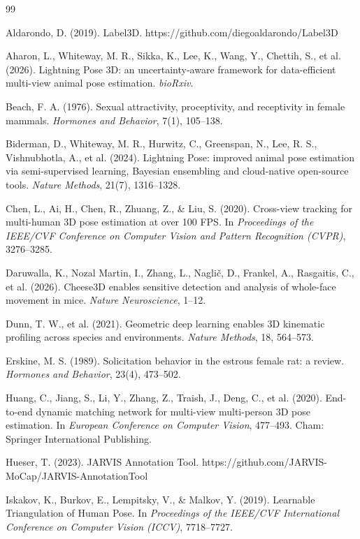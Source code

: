\documentclass[pdflatex, sn-nature]{sn-jnl}
\theoremstyle{thmstyleone}%
\theoremstyle{thmstyletwo}%
\theoremstyle{thmstylethree}%
\begin{document}
\begin{thebibliography}{99}

 Aldarondo, D. (2019). Label3D. https://github.com/diegoaldarondo/Label3D

 Aharon, L., Whiteway, M. R., Sikka, K., Lee, K., Wang, Y., Chettih, S., et al. (2026). Lightning Pose 3D: an uncertainty-aware framework for data-efficient multi-view animal pose estimation. \textit{bioRxiv}.

 Beach, F. A. (1976). Sexual attractivity, proceptivity, and receptivity in female mammals. \textit{Hormones and Behavior}, 7(1), 105--138.

 Biderman, D., Whiteway, M. R., Hurwitz, C., Greenspan, N., Lee, R. S., Vishnubhotla, A., et al. (2024). Lightning Pose: improved animal pose estimation via semi-supervised learning, Bayesian ensembling and cloud-native open-source tools. \textit{Nature Methods}, 21(7), 1316--1328.

 Chen, L., Ai, H., Chen, R., Zhuang, Z., \& Liu, S. (2020). Cross-view tracking for multi-human 3D pose estimation at over 100 FPS. In \textit{Proceedings of the IEEE/CVF Conference on Computer Vision and Pattern Recognition (CVPR)}, 3276--3285.

 Daruwalla, K., Nozal Martin, I., Zhang, L., Naglič, D., Frankel, A., Rasgaitis, C., et al. (2026). Cheese3D enables sensitive detection and analysis of whole-face movement in mice. \textit{Nature Neuroscience}, 1--12.

 Dunn, T. W., et al. (2021). Geometric deep learning enables 3D kinematic profiling across species and environments. \textit{Nature Methods}, 18, 564--573.

 Erskine, M. S. (1989). Solicitation behavior in the estrous female rat: a review. \textit{Hormones and Behavior}, 23(4), 473--502.

 Huang, C., Jiang, S., Li, Y., Zhang, Z., Traish, J., Deng, C., et al. (2020). End-to-end dynamic matching network for multi-view multi-person 3D pose estimation. In \textit{European Conference on Computer Vision}, 477--493. Cham: Springer International Publishing.

 Hueser, T. (2023). JARVIS Annotation Tool. https://github.com/JARVIS-MoCap/JARVIS-AnnotationTool

 Iskakov, K., Burkov, E., Lempitsky, V., \& Malkov, Y. (2019). Learnable Triangulation of Human Pose. In \textit{Proceedings of the IEEE/CVF International Conference on Computer Vision (ICCV)}, 7718--7727.


\end{thebibliography}
\end{document}

